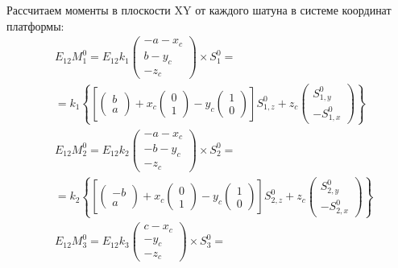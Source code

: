 Рассчитаем моменты в плоскости XY от каждого шатуна в системе координат платформы:
\begin{equation}
\label{eq:TorquesFromRodsInMovingCS}
\begin{aligned}
& E_{12}M_1^0 = E_{12}k_1\begin{pmatrix}
-a-x_c \\ b-y_c \\ -z_c
\end{pmatrix} \times S_1^0 = \\
& = k_1\left\{
\left[\begin{pmatrix}b \\ a\end{pmatrix} +
x_c\begin{pmatrix}0 \\ 1\end{pmatrix} -
y_c\begin{pmatrix}1 \\ 0\end{pmatrix}
\right]S_{1,z}^0+z_c\begin{pmatrix}S_{1,y}^0 \\ -S_{1,x}^0\end{pmatrix}\right\} \\
& E_{12}M_2^0 = E_{12}k_2\begin{pmatrix}
-a-x_c \\ -b-y_c \\ -z_c
\end{pmatrix} \times S_2^0 = \\
& = k_2\left\{
\left[\begin{pmatrix}-b \\ a\end{pmatrix} +
x_c\begin{pmatrix}0 \\ 1\end{pmatrix} -
y_c\begin{pmatrix}1 \\ 0\end{pmatrix}
\right]S_{2,z}^0+z_c\begin{pmatrix}S_{2,y}^0 \\ -S_{2,x}^0\end{pmatrix}\right\} \\
& E_{12}M_3^0 = E_{12}k_3\begin{pmatrix}
c-x_c \\ -y_c \\ -z_c
\end{pmatrix} \times S_3^0 = \\

\end{aligned}
\end{equation}
